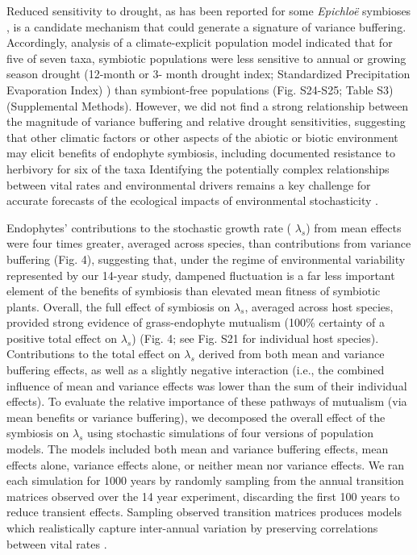 \documentclass[12pt]{article}
\begin{document}
Reduced sensitivity to drought, as has been reported for some \emph{Epichlo\"{e}} symbioses \cite{decunta2021systematic}, is a candidate mechanism that could generate a signature of variance buffering.
Accordingly, analysis of a climate-explicit population model indicated that for five of seven taxa, symbiotic populations were less sensitive to annual or growing season drought (12-month or 3- month drought index; Standardized Precipitation Evaporation Index) \cite{vicente2010multiscalar}) than symbiont-free populations (Fig. S24-S25; Table S3) (Supplemental Methods).
However, we did not find a strong relationship between the magnitude of variance buffering and relative drought sensitivities, suggesting that other climatic factors or other aspects of the abiotic or biotic environment may elicit benefits of endophyte symbiosis, including documented resistance to herbivory for six of the taxa \cite{rudgers2008invasive,crawford2010fungal}
Identifying the potentially complex relationships between vital rates and environmental drivers remains a key challenge for accurate forecasts of the ecological impacts of environmental stochasticity \cite{ehrlen2015predicting}.


Endophytes' contributions to the stochastic growth rate ( $\lambda_s$) from mean effects were four times greater, averaged across species, than contributions from variance buffering (Fig. 4),  suggesting that, under the regime of environmental variability represented by our 14-year study, dampened fluctuation is a far less important element of the benefits of symbiosis than elevated mean fitness of symbiotic plants. 
Overall, the full effect of symbiosis on $\lambda_s$, averaged across host species, provided strong evidence of grass-endophyte mutualism (100\% certainty of a positive total effect on $\lambda_s$) (Fig. 4; see Fig. S21 for individual host species).
Contributions to the total effect on $\lambda_s$ derived from both mean and variance buffering effects, as well as a slightly negative interaction (i.e., the combined influence of mean and variance effects was lower than the sum of their individual effects). To evaluate the relative importance of these pathways of mutualism (via mean benefits or variance buffering), we decomposed  the overall effect of the symbiosis on $\lambda_s$ using stochastic simulations of four versions of population models. 
The models included both mean and variance buffering effects, mean effects alone, variance effects alone, or neither mean nor variance effects. 
We ran each simulation for 1000 years by randomly sampling from the annual transition matrices observed over the 14 year experiment, discarding the first 100 years to reduce transient effects. 
Sampling observed transition matrices produces models which realistically capture inter-annual variation by preserving correlations between vital rates \cite{metcalf2015statistical}.
\end{document}
